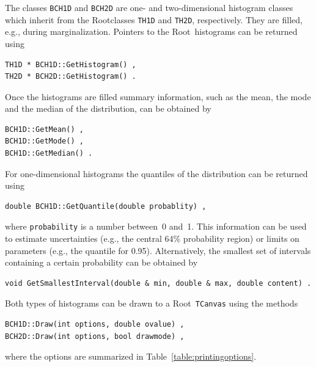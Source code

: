 \documentclass[11pt, a4paper]{article}
\newcommand{\Root}{{\sc Root}}
\begin{document}
The classes \verb|BCH1D| and \verb|BCH2D| are one- and two-dimensional
histogram classes which inherit from the \Root\-classes \verb|TH1D|
and \verb|TH2D|, respectively. They are filled, e.g., during
marginalization. Pointers to the \Root\ histograms can be returned
using
%
\begin{verbatim}
TH1D * BCH1D::GetHistogram() ,
TH2D * BCH2D::GetHistogram() .
\end{verbatim}
%
Once the histograms are filled summary information, such as the mean,
the mode and the median of the distribution, can be obtained by
%
\begin{verbatim}
BCH1D::GetMean() , 
BCH1D::GetMode() , 
BCH1D::GetMedian() . 
\end{verbatim} 
%
For one-dimensional histograms the quantiles of the distribution can
be returned using
%
\begin{verbatim}
double BCH1D::GetQuantile(double probablity) , 
\end{verbatim}
%
where \verb|probability| is a number between~0 and~1. This information
can be used to estimate uncertainties (e.g., the central 64\%
probability region) or limits on parameters (e.g., the quantile for
0.95). Alternatively, the smallest set of intervals containing a
certain probability can be obtained by 
%
\begin{verbatim}
void GetSmallestInterval(double & min, double & max, double content) . 
\end{verbatim}

\noindent 
Both types of histograms can be drawn to a \Root\ \verb|TCanvas| using
the methods
%
\begin{verbatim}
BCH1D::Draw(int options, double ovalue) , 
BCH2D::Draw(int options, bool drawmode) , 
\end{verbatim}  
%
where the options are summarized in Table~\ref{table:printingoptions}.
\end{document}
